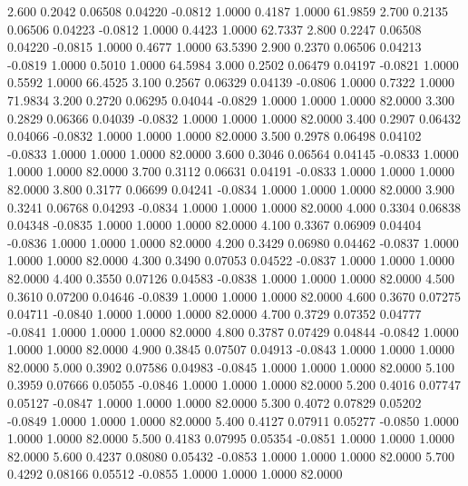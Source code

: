    2.600   0.2042   0.06508   0.04220  -0.0812   1.0000   0.4187   1.0000  61.9859
   2.700   0.2135   0.06506   0.04223  -0.0812   1.0000   0.4423   1.0000  62.7337
   2.800   0.2247   0.06508   0.04220  -0.0815   1.0000   0.4677   1.0000  63.5390
   2.900   0.2370   0.06506   0.04213  -0.0819   1.0000   0.5010   1.0000  64.5984
   3.000   0.2502   0.06479   0.04197  -0.0821   1.0000   0.5592   1.0000  66.4525
   3.100   0.2567   0.06329   0.04139  -0.0806   1.0000   0.7322   1.0000  71.9834
   3.200   0.2720   0.06295   0.04044  -0.0829   1.0000   1.0000   1.0000  82.0000
   3.300   0.2829   0.06366   0.04039  -0.0832   1.0000   1.0000   1.0000  82.0000
   3.400   0.2907   0.06432   0.04066  -0.0832   1.0000   1.0000   1.0000  82.0000
   3.500   0.2978   0.06498   0.04102  -0.0833   1.0000   1.0000   1.0000  82.0000
   3.600   0.3046   0.06564   0.04145  -0.0833   1.0000   1.0000   1.0000  82.0000
   3.700   0.3112   0.06631   0.04191  -0.0833   1.0000   1.0000   1.0000  82.0000
   3.800   0.3177   0.06699   0.04241  -0.0834   1.0000   1.0000   1.0000  82.0000
   3.900   0.3241   0.06768   0.04293  -0.0834   1.0000   1.0000   1.0000  82.0000
   4.000   0.3304   0.06838   0.04348  -0.0835   1.0000   1.0000   1.0000  82.0000
   4.100   0.3367   0.06909   0.04404  -0.0836   1.0000   1.0000   1.0000  82.0000
   4.200   0.3429   0.06980   0.04462  -0.0837   1.0000   1.0000   1.0000  82.0000
   4.300   0.3490   0.07053   0.04522  -0.0837   1.0000   1.0000   1.0000  82.0000
   4.400   0.3550   0.07126   0.04583  -0.0838   1.0000   1.0000   1.0000  82.0000
   4.500   0.3610   0.07200   0.04646  -0.0839   1.0000   1.0000   1.0000  82.0000
   4.600   0.3670   0.07275   0.04711  -0.0840   1.0000   1.0000   1.0000  82.0000
   4.700   0.3729   0.07352   0.04777  -0.0841   1.0000   1.0000   1.0000  82.0000
   4.800   0.3787   0.07429   0.04844  -0.0842   1.0000   1.0000   1.0000  82.0000
   4.900   0.3845   0.07507   0.04913  -0.0843   1.0000   1.0000   1.0000  82.0000
   5.000   0.3902   0.07586   0.04983  -0.0845   1.0000   1.0000   1.0000  82.0000
   5.100   0.3959   0.07666   0.05055  -0.0846   1.0000   1.0000   1.0000  82.0000
   5.200   0.4016   0.07747   0.05127  -0.0847   1.0000   1.0000   1.0000  82.0000
   5.300   0.4072   0.07829   0.05202  -0.0849   1.0000   1.0000   1.0000  82.0000
   5.400   0.4127   0.07911   0.05277  -0.0850   1.0000   1.0000   1.0000  82.0000
   5.500   0.4183   0.07995   0.05354  -0.0851   1.0000   1.0000   1.0000  82.0000
   5.600   0.4237   0.08080   0.05432  -0.0853   1.0000   1.0000   1.0000  82.0000
   5.700   0.4292   0.08166   0.05512  -0.0855   1.0000   1.0000   1.0000  82.0000
